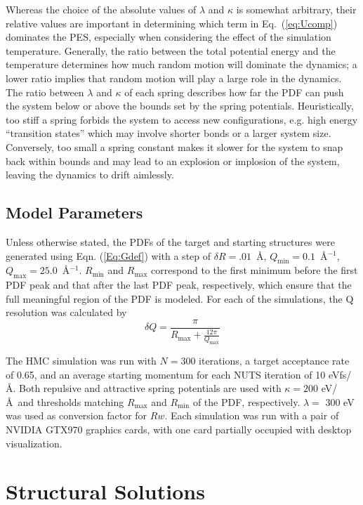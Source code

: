 Whereas the choice of the absolute values of $\lambda$ and $\kappa$ is somewhat arbitrary, their relative values are important in determining which  term in Eq.~(\ref{eq:Ucomp}) dominates the PES, especially when considering the effect of the simulation temperature.
Generally, the ratio between the total potential energy and the temperature determines how much random motion will dominate the dynamics; a lower ratio implies that random motion will play a large role in the dynamics.
The ratio between $\lambda$ and $\kappa$ of each spring describes how far the PDF can push the system below or above the bounds set by the spring potentials.
Heuristically, too stiff a spring  forbids the system to access new configurations, e.g.  high energy ``transition states'' which may involve shorter bonds or a larger system size.
Conversely, too small a spring constant makes it slower for the system to snap back within bounds and may lead to an explosion or implosion of the system, leaving the dynamics to drift aimlessly.

\subsection{Model Parameters}
Unless otherwise stated, the PDFs of the target and starting structures were generated using Eqn. (\ref{Eq:Gdef}) with a step of $\delta R=.01$~\AA, $Q_\mathrm{min}=0.1$~\AA$^{-1}$,  $Q_\mathrm{max}=25.0$~\AA$^{-1}$.
 $R_\mathrm{min}$ and $R_\mathrm{max}$ correspond to the first minimum before the first PDF peak and that after the last PDF peak, respectively, which ensure that the full meaningful region of the PDF is modeled.  For each of the simulations, the Q resolution was calculated by
\begin{equation}
\delta Q=\frac{\pi} {R_\mathrm{max} + \frac{12 \pi}{Q_\mathrm{max}}}
\end{equation}

The HMC simulation was run with $N=300$  iterations, a target acceptance rate of 0.65, and an average starting momentum for each NUTS iteration  of 10 eVfs/\AA. Both  repulsive and attractive spring potentials are used with $\kappa=200$ eV/\AA ~and thresholds matching $R_\mathrm{max}$ and $R_\mathrm{min}$ of the PDF, respectively.  $\lambda=$ 300 eV was used as conversion factor for $Rw$. Each simulation was run with a pair of NVIDIA GTX970 graphics cards, with one card partially occupied with desktop visualization.

\section{Structural Solutions}
